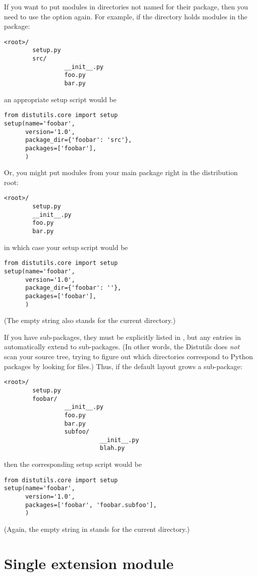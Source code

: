 \documentclass{manual}
\begin{document}
If you want to put modules in directories not named for their package,
then you need to use the  option again.  For
example, if the  directory holds modules in the
 package:
\begin{verbatim}
<root>/
        setup.py
        src/
                 __init__.py
                 foo.py
                 bar.py
\end{verbatim}
an appropriate setup script would be
\begin{verbatim}
from distutils.core import setup
setup(name='foobar',
      version='1.0',
      package_dir={'foobar': 'src'},
      packages=['foobar'],
      )
\end{verbatim}

Or, you might put modules from your main package right in the
distribution root:
\begin{verbatim}
<root>/
        setup.py
        __init__.py
        foo.py
        bar.py
\end{verbatim}
in which case your setup script would be
\begin{verbatim}
from distutils.core import setup
setup(name='foobar',
      version='1.0',
      package_dir={'foobar': ''},
      packages=['foobar'],
      )
\end{verbatim}
(The empty string also stands for the current directory.)

If you have sub-packages, they must be explicitly listed in
, but any entries in 
automatically extend to sub-packages.  (In other words, the Distutils
does \emph{not} scan your source tree, trying to figure out which
directories correspond to Python packages by looking for
 files.)  Thus, if the default layout grows a
sub-package:
\begin{verbatim}
<root>/
        setup.py
        foobar/
                 __init__.py
                 foo.py
                 bar.py
                 subfoo/
                           __init__.py
                           blah.py
\end{verbatim}
then the corresponding setup script would be
\begin{verbatim}
from distutils.core import setup
setup(name='foobar',
      version='1.0',
      packages=['foobar', 'foobar.subfoo'],
      )
\end{verbatim}
(Again, the empty string in  stands for the current
directory.)


\section{Single extension module}
\label{single-ext}
\end{document}
